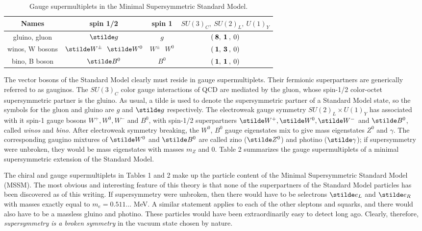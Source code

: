\renewcommand{\arraystretch}{1.55}
\begin{table}[t]
\caption{
Gauge supermultiplets in
the Minimal Supersymmetric Standard Model.\label{tab:gauge}}
\vspace{0.4cm}
\begin{center}
\begin{tabular}{|c|c|c|c|}
\hline
Names & spin 1/2 & spin 1 & $SU(3)_C, \> SU(2)_L,\> U(1)_Y$\\
\hline\hline
gluino, gluon &$ \stilde g$& $g$ & $(\>{\bf 8},\>{\bf 1}\>,\> 0)$
\\
\hline
winos, W bosons & $ \stilde W^\pm\>\>\> \stilde W^0 $&
 $W^\pm\>\>\> W^0$ & $(\>{\bf 1},\>{\bf 3}\>,\> 0)$
\\
\hline
bino, B boson &$\stilde B^0$&
 $B^0$ & $(\>{\bf 1},\>{\bf 1}\>,\> 0)$
\\
\hline
\end{tabular}
\end{center}
\end{table}
The vector bosons of the Standard Model clearly must reside
in gauge supermultiplets. Their fermionic superpartners are
generically referred to as gauginos.
The $SU(3)_C$ color gauge interactions of
QCD are mediated by the gluon, whose spin-1/2
color-octet supersymmetric partner is the gluino. As usual,
a tilde is used to denote the supersymmetric partner of
a Standard Model state, so the symbols for the gluon and
gluino are $g$ and $\stilde g$ respectively. The electroweak
gauge symmetry $SU(2)_L\times U(1)_Y$
has associated with it spin-1
gauge bosons $W^+, W^0, W^-$ and $B^0$, with spin-1/2 superpartners
$\stilde W^+, \stilde W^0, \stilde W^-$ and $\stilde B^0$,
called {\it winos} and {\it bino}.
After electroweak symmetry breaking, the $W^0$, $B^0$ gauge
eigenstates mix to give mass eigenstates $Z^0$ and $\gamma$.
The corresponding gaugino mixtures of $\stilde W^0$ and $\stilde B^0$
are called zino ($\stilde Z^0$) and photino ($\stilde \gamma$); if
supersymmetry were unbroken, they would be
mass eigenstates with masses $m_Z$ and 0.
Table 2 summarizes the gauge supermultiplets of a minimal supersymmetric
extension of the Standard Model.

The chiral and gauge supermultiplets in Tables 1 and 2 make up the
particle content of the Minimal Supersymmetric Standard Model
(MSSM).
The most obvious and interesting feature of this theory is that
none of the superpartners of the Standard Model particles has been
discovered as of this writing.
If supersymmetry were unbroken, then there would have to be
selectrons $\stilde e_L$ and $\stilde e_R$ with masses exactly equal to
$m_e = 0.511...$ MeV. A similar statement applies to each of the other
sleptons and squarks, and there would also have to be a massless gluino and
photino. These particles would have been extraordinarily easy to detect
long ago.
Clearly, therefore, {\it supersymmetry is a broken symmetry} in the
vacuum state chosen by nature.

